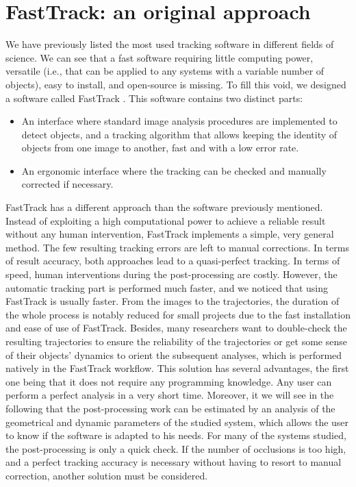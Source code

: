     \section{FastTrack: an original approach}
    We have previously listed the most used tracking software in different fields of science. We can see that a fast software requiring little computing power, versatile (i.e., that can be applied to any systems with a variable number of objects), easy to install, and open-source is missing.
    To fill this void, we designed a software called FastTrack \cite{gallois2021fasttrack}. This software contains two distinct parts:
    \begin{itemize}
        \item An interface where standard image analysis procedures are implemented to detect objects, and a tracking algorithm that allows keeping the identity of objects from one image to another, fast and with a low error rate.
        \item An ergonomic interface where the tracking can be checked and manually corrected if necessary.
    \end{itemize}
    FastTrack has a different approach than the software previously mentioned. Instead of exploiting a high computational power to achieve a reliable result without any human intervention, FastTrack implements a simple, very general method. The few resulting tracking errors are left to manual corrections. In terms of result accuracy, both approaches lead to a quasi-perfect tracking. In terms of speed, human interventions during the post-processing are costly. However, the automatic tracking part is performed much faster, and we noticed that using FastTrack is usually faster. From the images to the trajectories, the duration of the whole process is notably reduced for small projects due to the fast installation and ease of use of FastTrack. Besides, many researchers want to double-check the resulting trajectories to ensure the reliability of the trajectories or get some sense of their objects' dynamics to orient the subsequent analyses, which is performed natively in the FastTrack workflow. This solution has several advantages, the first one being that it does not require any programming knowledge. Any user can perform a perfect analysis in a very short time. Moreover, it we will see in the following that the post-processing work can be estimated by an analysis of the geometrical and dynamic parameters of the studied system, which allows the user to know if the software is adapted to his needs. For many of the systems studied, the post-processing is only a quick check. If the number of occlusions is too high, and a perfect tracking accuracy is necessary without having to resort to manual correction, another solution must be considered.

